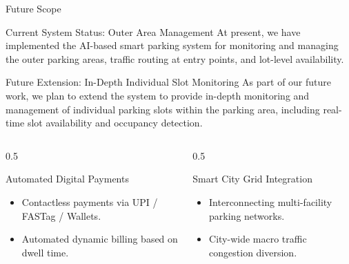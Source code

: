 \documentclass[aspectratio=169]{beamer}
\begin{document}
\begin{frame}{Future Scope}
    \begin{block}{Current System Status: Outer Area Management}
        At present, we have implemented the AI-based smart parking system for monitoring and managing the outer parking areas, traffic routing at entry points, and lot-level availability.
    \end{block}
    
    \begin{block}{Future Extension: In-Depth Individual Slot Monitoring}
        As part of our future work, we plan to extend the system to provide in-depth monitoring and management of individual parking slots within the parking area, including real-time slot availability and occupancy detection.
    \end{block}

    \begin{columns}
        \begin{column}{0.5\textwidth}
            \begin{block}{Automated Digital Payments}
                \begin{itemize}
                    \item Contactless payments via UPI / FASTag / Wallets.
                    \item Automated dynamic billing based on dwell time.
                \end{itemize}
            \end{block}
        \end{column}
        \begin{column}{0.5\textwidth}
            \begin{block}{Smart City Grid Integration}
                \begin{itemize}
                    \item Interconnecting multi-facility parking networks.
                    \item City-wide macro traffic congestion diversion.
                \end{itemize}
            \end{block}
        \end{column}
    \end{columns}
\end{frame}
\end{document}
